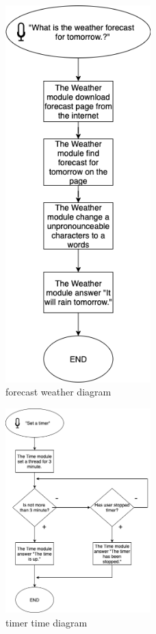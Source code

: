 \begin{figure}[H]
    \centering
    \includegraphics[width=0.5\textwidth]{img/forecast_weather_diagram.png}
    \caption{forecast weather diagram}
\end{figure}

\begin{figure}[H]
    \centering
    \includegraphics[width=0.5\textwidth]{img/timer_time_diagram.png}
    \caption{timer time diagram}
\end{figure}

